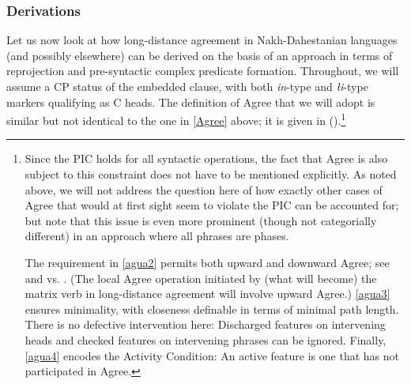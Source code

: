 \documentclass[output=paper
,modfonts
,nonflat]{langsci/langscibook}
\begin{document}
\subsubsection{Derivations}

Let us now look at how long-distance agreement in Nakh-Dahestanian
languages (and possibly elsewhere) can be derived on the basis of an
approach in terms of reprojection and pre-syntactic complex predicate
formation. Throughout, we will assume a CP status of the embedded
clause, with both  {\itshape \textcrlambda in}-type and {\itshape {\l}i}-type
markers qualifying as C heads. The definition of Agree that we will
adopt is similar but not identical to the one in \ref{Agree} above; it
is given in (\Next).\footnote{Since the PIC holds for all syntactic
  operations, the fact that Agree is also subject to this constraint
  does not have to be mentioned explicitly. As noted above, we will
  not address the question here of how exactly other cases of Agree that
  would at first sight seem to violate the PIC can be accounted for;
  but note that this issue is even more prominent (though not
  categorially different) in an approach where all phrases are
  phases. 

The requirement in \ref{agua2} permits both upward and downward Agree; see
\cite{Zeijlstra:12} and \cite{Bjorkman&Zeijlstra:14} vs. \cite{Preminger:13:tha}.
(The local Agree operation initiated by (what will become) the matrix verb in
long-distance agreement will involve upward Agree.) \ref{agua3}
ensures minimality, with closeness definable in terms of minimal path
length. There is no defective intervention here: Discharged
features on intervening  heads and checked features on intervening phrases can be ignored. Finally,
\ref{agua4} encodes the Activity Condition: An active feature is one
that has not participated in Agree.}
\end{document}
